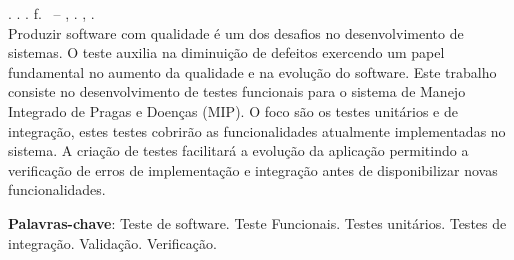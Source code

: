 
\begin{resumo}[RESUMO]
\begin{SingleSpacing}

\imprimirautorcitacao. \imprimirtitulo. \imprimirdata. \pageref {LastPage} f. \imprimirprojeto\ – \imprimirprograma, \imprimirinstituicao. \imprimirlocal, \imprimirdata.\\

Produzir software com qualidade é um dos desafios no desenvolvimento de sistemas. O teste auxilia na diminuição de defeitos exercendo um papel fundamental no aumento da qualidade e na evolução do software. Este trabalho consiste no desenvolvimento de testes funcionais para o sistema de Manejo Integrado de Pragas e Doenças (MIP). O foco são os testes unitários e de integração, estes testes cobrirão as funcionalidades atualmente implementadas no sistema. A criação de testes facilitará a evolução da aplicação permitindo a verificação de erros de implementação e integração antes de disponibilizar novas funcionalidades. 

\textbf{Palavras-chave}: Teste de software. Teste Funcionais. Testes unitários. Testes de integração. Validação. Verificação.

\end{SingleSpacing}
\end{resumo}

